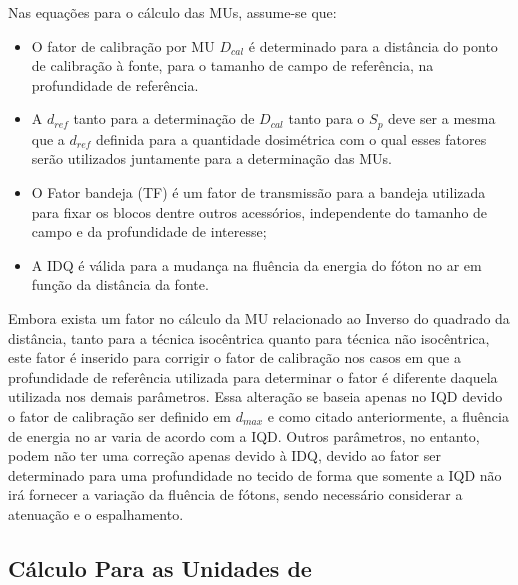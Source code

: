\documentclass[11pt,a4paper]{article}
\begin{document}
    Nas equações para o cálculo das MUs, assume-se que:

    \begin{itemize}[label=\textcolor{CarnationPink}{$\star$}]
        \item O fator de calibração por MU $D_{cal}$ é determinado para a distância do ponto de calibração à fonte, para o tamanho de campo de referência, na profundidade de referência.
        \item A $d_{ref}$ tanto para a determinação de $D_{cal}$ tanto para o $S_p$ deve ser a mesma que  a $d_{ref}$ definida para a quantidade dosimétrica com o qual esses fatores serão utilizados juntamente para a determinação das MUs.
        \item O Fator bandeja (TF) é um fator de transmissão para a bandeja utilizada para fixar os blocos dentre outros acessórios, independente do tamanho de campo e da profundidade de interesse;
        \item A IDQ é válida para a mudança na fluência da energia do fóton no ar em função da distância da fonte. 
    \end{itemize}


    \begin{tcolorbox}[width=\textwidth, colback={white}, title={$\bigstar$ \LobsterTwo{Observação} $\bigstar $}, coltitle={CarnationPink}, colframe={DarkTurquoise}, fonttitle=\rmfamily\bfseries\Large]

        Embora exista um fator no cálculo da MU relacionado ao Inverso do quadrado da distância, tanto para a técnica isocêntrica quanto para técnica não isocêntrica, este fator é inserido para corrigir o fator de calibração nos casos em que a profundidade de referência utilizada para determinar o fator é diferente daquela utilizada nos demais parâmetros. Essa alteração se baseia apenas no IQD devido o fator de calibração ser definido em $d_{max}$ e como citado anteriormente, a fluência de energia no ar varia de acordo com a IQD. Outros parâmetros, no entanto, podem não ter uma correção apenas devido à IDQ, devido ao fator ser determinado para uma profundidade no tecido de forma que somente a IQD não irá fornecer a variação da fluência de fótons, sendo necessário considerar a atenuação e o espalhamento. 
    \end{tcolorbox}

    \subsection{Cálculo Para as Unidades de }
\end{document}
